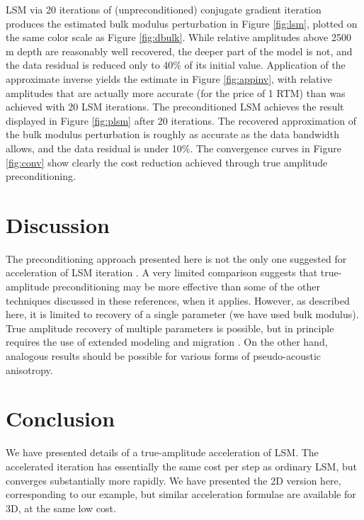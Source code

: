 LSM via 20 iterations of (unpreconditioned) conjugate gradient
iteration produces the estimated bulk modulus perturbation in Figure
\ref{fig:lsm}, plotted on the same color scale as Figure
\ref{fig:dbulk}. While relative amplitudes above 2500 m depth are
reasonably well recovered, the deeper part of the model is not, and
the data residual is reduced only to 40\% of its initial value. 
Application of the approximate inverse yields the estimate in Figure
\ref{fig:appinv}, with relative amplitudes that are actually more
accurate (for the price of 1 RTM) than was achieved with 20 LSM
iterations. The preconditioned LSM achieves the result displayed in
Figure \ref{fig:plsm} after 20 iterations. The recovered approximation
of the bulk modulus perturbation is roughly as accurate as the data
bandwidth allows, and the data residual is under 10\%. The convergence
curves in Figure \ref{fig:conv} show clearly the cost reduction
achieved through true amplitude preconditioning.

\section{Discussion}


The preconditioning approach presented here is not the
only one suggested for acceleration of LSM iteration
\cite[]{Aoki:09,Berkhout:09d,HuangNammourSymes:16,RochaSavaGuitton:17,Guitton:17}. A
very limited comparison suggests that true-amplitude preconditioning
may be more effective than some of the other techniques discussed in
these references, when it applies. However, as described here, it is
limited to recovery of a single parameter (we have used bulk
modulus). True amplitude recovery of multiple parameters is possible,
but in principle requires the use of extended modeling and migration
\cite[]{YuZhang:14}. On the other hand, analogous results should be
possible for various forms of
pseudo-acoustic anisotropy.

\section{Conclusion}
We have presented details of a true-amplitude acceleration of LSM. The
accelerated iteration has essentially the same cost per step as
ordinary LSM, but converges substantially more rapidly. We have
presented the 2D version here, corresponding to our example, but
similar acceleration formulae are available for 3D, at the same low cost.

